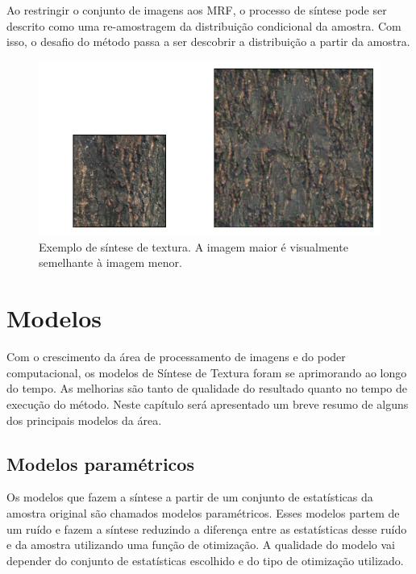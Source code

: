 
Ao restringir o conjunto de imagens aos
MRF,
o processo de síntese
pode ser descrito como uma re-amostragem
da distribuição condicional da amostra.
Com isso, o desafio do método passa a ser 
descobrir a distribuição a partir
da amostra.

\begin{figure}[!ht]
	\centering
	\includegraphics[width=\linewidth*2/3]{files/assets/sinth.png}
	\caption{Exemplo de síntese de textura. A imagem
		maior é visualmente semelhante à imagem menor.}
	\label{sinth}
\end{figure}


\chapter{Modelos}

Com o crescimento da área de processamento
de imagens e do poder computacional,
os modelos de Síntese de Textura foram
se aprimorando ao longo do tempo.
As melhorias são tanto de qualidade
do resultado quanto no tempo de 
execução do método. Neste capítulo
será apresentado um breve resumo de
alguns dos principais modelos
da área.



\section{Modelos paramétricos}

Os modelos que fazem a síntese a partir
de um conjunto de estatísticas da amostra
original são chamados modelos paramétricos.
Esses modelos partem de um ruído e fazem
a síntese reduzindo
a diferença entre as estatísticas desse
ruído e da amostra utilizando uma função de 
otimização.
A qualidade do modelo vai depender do
conjunto de estatísticas escolhido
e do tipo de otimização utilizado.


